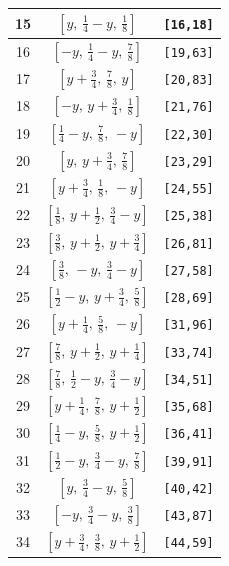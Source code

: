 \documentclass[fleqn,8pt]{jsarticle}
\begin{document}
\begin{longtable}{ccc}
15 & $\left[ y,\, \frac{1}{4} - y,\, \frac{1}{8} \right]$ & {\tt [16,18]} \\ \hline
16 & $\left[ - y,\, \frac{1}{4} - y,\, \frac{7}{8} \right]$ & {\tt [19,63]} \\ \hline
17 & $\left[ y + \frac{3}{4},\, \frac{7}{8},\, y \right]$ & {\tt [20,83]} \\ \hline
18 & $\left[ - y,\, y + \frac{3}{4},\, \frac{1}{8} \right]$ & {\tt [21,76]} \\ \hline
19 & $\left[ \frac{1}{4} - y,\, \frac{7}{8},\, - y \right]$ & {\tt [22,30]} \\ \hline
20 & $\left[ y,\, y + \frac{3}{4},\, \frac{7}{8} \right]$ & {\tt [23,29]} \\ \hline
21 & $\left[ y + \frac{3}{4},\, \frac{1}{8},\, - y \right]$ & {\tt [24,55]} \\ \hline
22 & $\left[ \frac{1}{8},\, y + \frac{1}{2},\, \frac{3}{4} - y \right]$ & {\tt [25,38]} \\ \hline
23 & $\left[ \frac{3}{8},\, y + \frac{1}{2},\, y + \frac{3}{4} \right]$ & {\tt [26,81]} \\ \hline
24 & $\left[ \frac{3}{8},\, - y,\, \frac{3}{4} - y \right]$ & {\tt [27,58]} \\ \hline
25 & $\left[ \frac{1}{2} - y,\, y + \frac{3}{4},\, \frac{5}{8} \right]$ & {\tt [28,69]} \\ \hline
26 & $\left[ y + \frac{1}{4},\, \frac{5}{8},\, - y \right]$ & {\tt [31,96]} \\ \hline
27 & $\left[ \frac{7}{8},\, y + \frac{1}{2},\, y + \frac{1}{4} \right]$ & {\tt [33,74]} \\ \hline
28 & $\left[ \frac{7}{8},\, \frac{1}{2} - y,\, \frac{3}{4} - y \right]$ & {\tt [34,51]} \\ \hline
29 & $\left[ y + \frac{1}{4},\, \frac{7}{8},\, y + \frac{1}{2} \right]$ & {\tt [35,68]} \\ \hline
30 & $\left[ \frac{1}{4} - y,\, \frac{5}{8},\, y + \frac{1}{2} \right]$ & {\tt [36,41]} \\ \hline
31 & $\left[ \frac{1}{2} - y,\, \frac{3}{4} - y,\, \frac{7}{8} \right]$ & {\tt [39,91]} \\ \hline
32 & $\left[ y,\, \frac{3}{4} - y,\, \frac{5}{8} \right]$ & {\tt [40,42]} \\ \hline
33 & $\left[ - y,\, \frac{3}{4} - y,\, \frac{3}{8} \right]$ & {\tt [43,87]} \\ \hline
34 & $\left[ y + \frac{3}{4},\, \frac{3}{8},\, y + \frac{1}{2} \right]$ & {\tt [44,59]} \\ \hline

\end{longtable}
\end{document}
